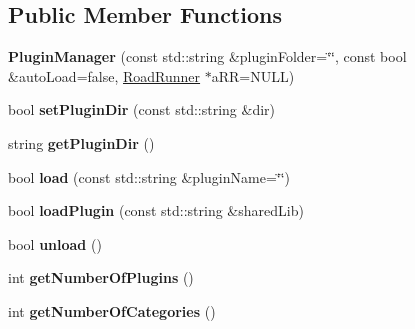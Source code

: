 \subsection*{Public Member Functions}
\begin{DoxyCompactItemize}
\item 
\hypertarget{classrr_1_1_plugin_manager_a248715c045bf8effbcc8c73636dd1a0f}{{\bfseries Plugin\-Manager} (const std\-::string \&plugin\-Folder=\char`\"{}\char`\"{}, const bool \&auto\-Load=false, \hyperlink{classrr_1_1_road_runner}{Road\-Runner} $\ast$a\-R\-R=N\-U\-L\-L)}\label{classrr_1_1_plugin_manager_a248715c045bf8effbcc8c73636dd1a0f}

\item 
\hypertarget{classrr_1_1_plugin_manager_a557c0927bbf59266a52e2804a3333bcf}{bool {\bfseries set\-Plugin\-Dir} (const std\-::string \&dir)}\label{classrr_1_1_plugin_manager_a557c0927bbf59266a52e2804a3333bcf}

\item 
\hypertarget{classrr_1_1_plugin_manager_a53c2bb2372f06c78aa2830cb96cc6628}{string {\bfseries get\-Plugin\-Dir} ()}\label{classrr_1_1_plugin_manager_a53c2bb2372f06c78aa2830cb96cc6628}

\item 
\hypertarget{classrr_1_1_plugin_manager_aa303e0a082580c6ec4c16e764c7ab821}{bool {\bfseries load} (const std\-::string \&plugin\-Name=\char`\"{}\char`\"{})}\label{classrr_1_1_plugin_manager_aa303e0a082580c6ec4c16e764c7ab821}

\item 
\hypertarget{classrr_1_1_plugin_manager_a66c1f9220a33cbaea11f401460198f9f}{bool {\bfseries load\-Plugin} (const std\-::string \&shared\-Lib)}\label{classrr_1_1_plugin_manager_a66c1f9220a33cbaea11f401460198f9f}

\item 
\hypertarget{classrr_1_1_plugin_manager_ab13289338b5981934d1f9c8a404a5cc5}{bool {\bfseries unload} ()}\label{classrr_1_1_plugin_manager_ab13289338b5981934d1f9c8a404a5cc5}

\item 
\hypertarget{classrr_1_1_plugin_manager_a38f8b833e20bbb42b2bc6ccbff6a6c49}{int {\bfseries get\-Number\-Of\-Plugins} ()}\label{classrr_1_1_plugin_manager_a38f8b833e20bbb42b2bc6ccbff6a6c49}

\item 
\hypertarget{classrr_1_1_plugin_manager_a66af1597e2b65d03e05e409efacfb561}{int {\bfseries get\-Number\-Of\-Categories} ()}\label{classrr_1_1_plugin_manager_a66af1597e2b65d03e05e409efacfb561}


\end{DoxyCompactItemize}
